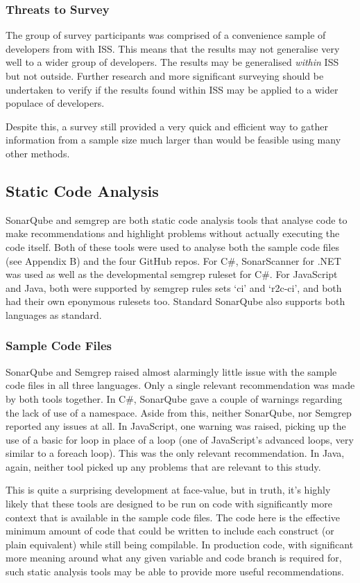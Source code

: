 \documentclass{article}
\begin{document}
        \subsubsection{Threats to Survey}
            The group of survey participants was comprised of a convenience sample of developers from with ISS. This means that the results may not generalise very well to a wider group of developers. The results may be generalised \emph{within} ISS but not outside. Further research and more significant surveying should be undertaken to verify if the results found within ISS may be applied to a wider populace of developers.

            Despite this, a survey still provided a very quick and efficient way to gather information from a sample size much larger than would be feasible using many other methods.
    \subsection{Static Code Analysis}
        SonarQube and semgrep are both static code analysis tools that analyse code to make recommendations and highlight problems without actually executing the code itself. Both of these tools were used to analyse both the sample code files (see Appendix B) and the four GitHub repos. For C\#, SonarScanner for .NET was used as well as the developmental semgrep ruleset for C\#. For JavaScript and Java, both were supported by semgrep rules sets `ci' and `r2c-ci', and both had their own eponymous rulesets too. Standard SonarQube also supports both languages as standard.
        \subsubsection{Sample Code Files}
            SonarQube and Semgrep raised almost alarmingly little issue with the sample code files in all three languages. Only a single relevant recommendation was made by both tools together.
            In C\#, SonarQube gave a couple of warnings regarding the lack of use of a namespace. Aside from this, neither SonarQube, nor Semgrep reported any issues at all. In JavaScript, one warning was raised, picking up the use of a basic for loop in place of a  loop (one of JavaScript's advanced loops, very similar to a foreach loop). This was the only relevant recommendation. In Java, again, neither tool picked up any problems that are relevant to this study.

            This is quite a surprising development at face-value, but in truth, it's highly likely that these tools are designed to be run on code with significantly more context that is available in the sample code files. The code here is the effective minimum amount of code that could be written to include each construct (or plain equivalent) while still being compilable. In production code, with significant more meaning around what any given variable and code branch is required for, such static analysis tools may be able to provide more useful recommendations.
\end{document}
